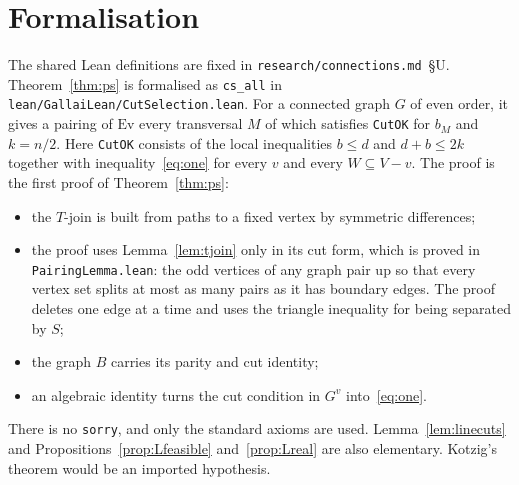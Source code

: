 \documentclass[11pt]{amsart}
\theoremstyle{definition}
\newcommand{\Ev}{\mathrm{Ev}}
\begin{document}
\section{Formalisation}\label{sec:lean}
The shared Lean definitions are fixed in \texttt{research/connections.md}~\S U.
Theorem~\ref{thm:ps} is formalised as \texttt{cs\_all} in \texttt{lean/GallaiLean/CutSelection.lean}.
For a connected graph $G$ of even order, it gives a pairing of $\Ev$ every transversal $M$ of which
satisfies \texttt{CutOK} for $b_M$ and $k=n/2$. Here \texttt{CutOK} consists of the local
inequalities $b\le d$ and $d+b\le2k$ together with inequality~\eqref{eq:one} for every $v$ and every
$W\subseteq V-v$. The proof is the first proof of Theorem~\ref{thm:ps}:
\begin{itemize}
\item the $T$-join is built from paths to a fixed vertex by symmetric differences;
\item the proof uses Lemma~\ref{lem:tjoin} only in its cut form, which is proved in
\texttt{PairingLemma.lean}: the odd vertices of any graph pair up so that every vertex set splits at
most as many pairs as it has boundary edges.
The proof deletes one edge at a time and uses the triangle inequality for being separated by $S$;
\item the graph $B$ carries its parity and cut identity;
\item an algebraic identity turns the cut condition in $G^v$ into~\eqref{eq:one}.
\end{itemize}
There is no \texttt{sorry}, and only the standard axioms are used. Lemma~\ref{lem:linecuts} and
Propositions~\ref{prop:Lfeasible} and~\ref{prop:Lreal} are also elementary. Kotzig's theorem would
be an imported hypothesis.
\end{document}
